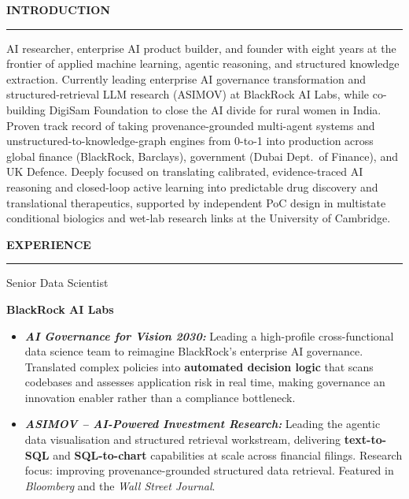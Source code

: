 \documentclass[10pt,a4paper,ragged2e]{altacv}
\makeatletter
\renewcommand{\makecvheader}{%
  \begingroup
    \raggedright\color{emphasis}%
    {\Huge\bfseries\MakeUppercase{\@name}\par}
    \smallskip
    {\footnotesize\bfseries\@personalinfo\par}
  \endgroup\smallskip
}
\renewcommand{\cvsection}[2][]{%
  \medskip\vspace{1pt}%
  \ifstrequal{#1}{}{}{\marginpar{\vspace*{\dimexpr-0.72\baselineskip}\raggedright}}%
  {\color{heading}\Large\bfseries\MakeUppercase{#2}}\\[-1ex]%
  {\color{heading}\rule{\linewidth}{2pt}\par}\smallskip
}
\renewcommand{\cvevent}[4]{%
  {\large\color{emphasis}#1\par}
  \vspace{1pt}\normalsize
  \ifstrequal{#2}{}{}{%
    \textbf{\color{accent}#2}\par
    \vspace{1pt}%
  }
  \ifstrequal{#3}{}{}{{\small\makebox[0.5\linewidth][l]{\faCalendar\hspace{0.5em}#3}}}%
  \ifstrequal{#4}{}{}{{\small\makebox[0.5\linewidth][l]{\faMapMarker\hspace{0.5em}#4}}}\par
  \vspace{2pt}\normalsize
}
\makeatother
\begin{document}

\begin{fullwidth}
\makecvheader
\end{fullwidth}
\vspace{-0.3em}


\cvsection[page1sidebar]{Introduction}
AI researcher, enterprise AI product builder, and founder with eight years at the frontier of applied machine learning, agentic reasoning, and structured knowledge extraction. Currently leading enterprise AI governance transformation and structured-retrieval LLM research (ASIMOV) at BlackRock AI Labs, while co-building DigiSam Foundation to close the AI divide for rural women in India. Proven track record of taking provenance-grounded multi-agent systems and unstructured-to-knowledge-graph engines from 0-to-1 into production across global finance (BlackRock, Barclays), government (Dubai Dept.\ of Finance), and UK Defence. Deeply focused on translating calibrated, evidence-traced AI reasoning and closed-loop active learning into predictable drug discovery and translational therapeutics, supported by independent PoC design in multistate conditional biologics and wet-lab research links at the University of Cambridge.

\cvsection{Experience}

\cvevent{Senior Data Scientist}{BlackRock AI Labs}{July 2025 -- Present}{Edinburgh, United Kingdom}
\begin{itemize}
\item \textbf{\textit{AI Governance for Vision 2030:}} Leading a high-profile cross-functional data science team to reimagine BlackRock's enterprise AI governance. Translated complex policies into \textbf{automated decision logic} that scans codebases and assesses application risk in real time, making governance an innovation enabler rather than a compliance bottleneck.
\item \textbf{\textit{ASIMOV -- AI-Powered Investment Research:}} Leading the agentic data visualisation and structured retrieval workstream, delivering \textbf{text-to-SQL} and \textbf{SQL-to-chart} capabilities at scale across financial filings. Research focus: improving provenance-grounded structured data retrieval. Featured in \textit{Bloomberg} and the \textit{Wall Street Journal}.
\end{itemize}
\end{document}
